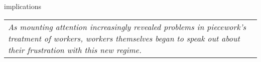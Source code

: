 \documentclass[presentation]{subfiles}
\begin{document}






\begin{frame}{implications}
  

{\renewcommand{\baselinestretch}{1.2}
  \begin{tabular}{p{}}
{\large\itshape{As mounting attention increasingly revealed problems in piecework's treatment of workers, workers themselves began to speak out about their frustration with this new regime.}}
  \end{tabular}
\renewcommand{\baselinestretch}{1}}

\end{frame}
\end{document}
